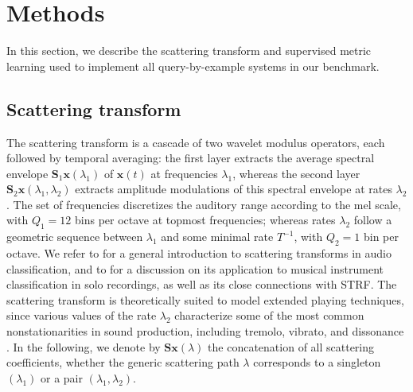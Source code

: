 


\section{Methods}

In this section, we describe the scattering transform and supervised metric learning used to implement all query-by-example systems in our benchmark.

\subsection{Scattering transform} %
The scattering transform is a cascade of two wavelet modulus operators, each followed by temporal averaging:
the first layer extracts the average spectral envelope $\mathbf{S}_1 \boldsymbol{x} (\lambda_1)$ of $\boldsymbol{x}(t)$ at frequencies $\lambda_1$, whereas the second layer $\mathbf{S}_2 \boldsymbol{x} (\lambda_1, \lambda_2)$ extracts amplitude modulations of this spectral envelope at rates $\lambda_2$.
The set of frequencies discretizes the auditory range according to the mel scale, with $Q_1 = 12$ bins per octave at topmost frequencies; whereas rates $\lambda_2$ follow a geometric sequence between $\lambda_1$ and some minimal rate $T^{-1}$, with $Q_2 = 1$ bin per octave.
We refer to \cite{anden2014taslp} for a general introduction to scattering transforms in audio classification, and to \cite[sections 3.2 and 4.5]{lostanlen2017phd} for a discussion on its application to musical instrument classification in solo recordings, as well as its close connections with STRF. The scattering transform is theoretically suited to model extended playing techniques, since various values of the rate $\lambda_2$ characterize some of the most common nonstationarities in sound production, including tremolo, vibrato, and dissonance \cite[section 4]{anden2012dafx}.
In the following, we denote by $\mathbf{S}\boldsymbol{x}(\lambda)$ the concatenation of all scattering coefficients, whether the generic scattering path $\lambda$ corresponds to a singleton $(\lambda_1)$ or a pair $(\lambda_1,\lambda_2)$.

